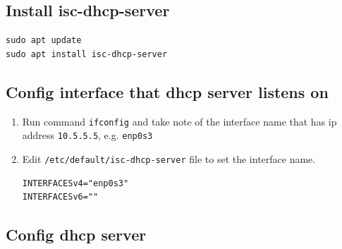\documentclass[11pt]{article}
\begin{document}
\subsection{Install isc-dhcp-server}
\label{sec:org446a426}

\begin{verbatim}
sudo apt update
sudo apt install isc-dhcp-server
\end{verbatim}

\subsection{Config interface that dhcp server listens on}
\label{sec:orgcca5f04}

\begin{enumerate}
\item Run command \texttt{ifconfig} and take note of the interface name that has ip address \texttt{10.5.5.5}, e.g. \texttt{enp0s3}
\item Edit \texttt{/etc/default/isc-dhcp-server} file to set the interface name.
\begin{verbatim}
INTERFACESv4="enp0s3"
INTERFACESv6=""
\end{verbatim}
\end{enumerate}

\subsection{Config dhcp server}
\label{sec:org3ddb907}
\end{document}
